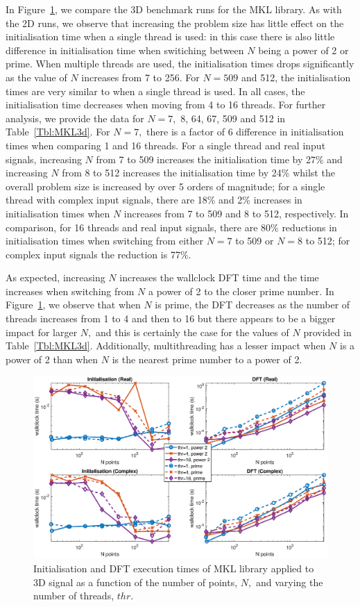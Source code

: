 \documentclass[a4paper]{article}
\begin{document}
In Figure~\ref{3DMKL}, we compare the 3D benchmark runs for the MKL
library. As with the 2D runs, we observe that increasing the problem
size has little effect on the initialisation time when a single thread
is used: in this case there is also little difference in
initialisation time when switiching between $N$ being a power of 2 or
prime. When multiple threads are used, the initialisation times drops
significantly as the value of $N$ increases from 7 to 256. For $N=509$
and 512, the initialisation times are very similar to when a single
thread is used. In all cases, the initialisation time decreases when
moving from 4 to 16 threads. For further analysis, we provide the data
for $N=7,$ 8, 64, 67, 509 and 512 in Table~\ref{Tbl:MKL3d}. For $N=7,$
there is a factor of 6 difference in initialisation times when
comparing 1 and 16 threads. For a single thread and real input
signals, increasing $N$ from 7 to 509 increases the initialisation
time by 27\% and increasing $N$ from 8 to 512 increases the
initialisation time by 24\% whilst the overall problem size is
increased by over 5 orders of magnitude; for a single thread with
complex input signals, there are 18\% and 2\% increases in
initialisation times when $N$ increases from 7 to 509 and 8 to 512,
respectively. In comparison, for 16 threads and real input signals,
there are 80\% reductions in initialisation times when switching from
either $N=7$ to 509 or $N=8$ to 512; for complex input signals the
reduction is 77\%.

As expected, increasing $N$ increases the wallclock DFT time and the
time increases when switching from $N$ a power of 2 to the closer
prime number. In Figure~\ref{3DMKL}, we observe that when $N$ is
prime, the DFT decreases as the number of threads increases from 1 to
4 and then to 16 but there appears to be a bigger impact for larger
$N,$ and this is certainly the case for the values of $N$ provided in
Table~\ref{Tbl:MKL3d}. Additionally, multithreading has a lesser
impact when $N$ is a power of 2 than when $N$ is the nearest prime
number to a power of 2.

\begin{figure}[htb]
    \centering
    \includegraphics[width=\linewidth]{../results/mkl_3d_thr.eps}
  \caption{Initialisation and DFT execution times of MKL library applied to 3D signal as a function of the
    number of points, $N,$ and varying the number of threads, $thr.$ }
  \label{3DMKL}
\end{figure}
\end{document}
